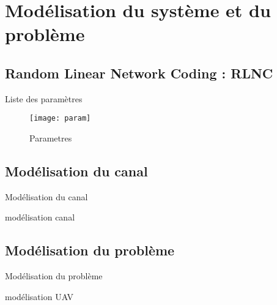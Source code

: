 \section{Modélisation du système et du problème}

\subsection{Random Linear Network Coding : RLNC}
\begin{frame}{Liste des paramètres}

\begin{figure}[t]
	\centering
	\texttt{[image: param]}
	\caption{Parametres}
\end{figure}
\end{frame}


\subsection{Modélisation du canal}
\begin{frame}{Modélisation du canal}

modélisation canal
\end{frame}

\subsection{Modélisation du problème}
\begin{frame}{Modélisation du problème}

modélisation UAV
\end{frame}

